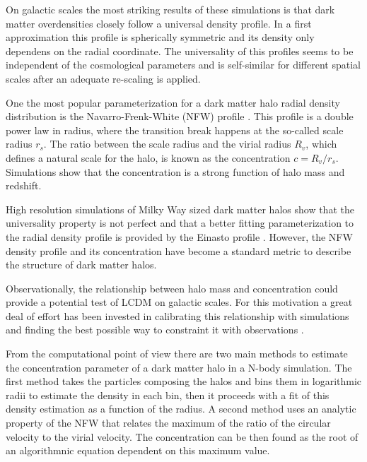 \documentclass{emulateapj}
\begin{document}
On galactic scales the most striking results of these simulations is
that dark matter overdensities closely follow a universal density
profile. 
In a first approximation this profile is spherically symmetric and its
density only dependens on the radial coordinate.
The universality of this profiles seems to be independent of the
cosmological parameters and is self-similar for different spatial
scales after an adequate re-scaling is applied. 
\citep{NFW,Taylor2001}

One the most popular parameterization for a dark matter halo radial density
distribution is the Navarro-Frenk-White (NFW) profile
\citep{NFW}.
This profile is a double power law in radius, where the transition break
happens at the so-called scale radius $r_s$.
The ratio between the scale radius and the virial radius $R_v$, which
defines a natural scale for the halo, is known as the concentration
$c=R_v/r_s$. 
Simulations show that the concentration is a strong function of halo mass and
redshift. 


High resolution simulations of Milky Way sized dark matter halos
\citep{Navarro2010} show that the universality property is not
perfect and that a better fitting parameterization to the radial
density profile is provided by the Einasto profile
\citep{Einasto1965}.
However, the NFW density profile and its concentration have become a
standard metric to describe the structure of dark matter
halos.


Observationally, the relationship between halo mass and concentration
could provide a potential test of LCDM on galactic scales.
For this motivation a great deal of effort has been
invested in calibrating this relationship with simulations
\citep{Neto2007,Duffy2008,Munoz2011,Prada2012,Ludlow2014} and 
finding the best possible way to constraint it with observations
\citep{Buote2007,Comerford2007,Mandelbaum2008,Giocoli2014,Foex2014,Shan2015}.

From the computational point of view there are two main methods to
estimate the concentration parameter of a dark matter halo in a N-body
simulation.
The first method takes the particles composing the halos
and bins them in logarithmic radii to estimate the density in each
bin, then it proceeds with a fit of this density estimation as a
function of the radius.
A second method uses an analytic property of the
NFW that relates the maximum of the ratio of the circular velocity to
the virial velocity.
The concentration can be then found as the root of an algorithmnic
equation dependent on this maximum value.
\end{document}
